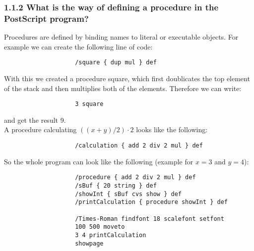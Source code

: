 \documentclass{article}
\begin{document}
\begin{adjustwidth}{2em}{2em}
		\subsubsection*{1.1.2 What is the way of defining a procedure in the PostScript program?}
		\begin{adjustwidth}{2em}{}
			Procedures are defined by binding names to literal or executable objects. For example we can create the following line of code:
			\begin{adjustwidth}{2em}{2em}
			\begin{tcolorbox}
				\begin{verbatim}
					/square { dup mul } def
				\end{verbatim}
			\end{tcolorbox}
			\end{adjustwidth}
			\noindent With this we created a procedure square, which first doublicates the top element of the stack and then multiplies both of the elements. Therefore we can write:
			\begin{adjustwidth}{2em}{2em}
			\begin{tcolorbox}
				\begin{verbatim}
					3 square
				\end{verbatim}
			\end{tcolorbox}
			\end{adjustwidth}
			\noindent and get the result 9. \\
			A procedure calculating $((x+y) / 2) \cdot 2$ looks like the following:
			\begin{adjustwidth}{2em}{2em}
			\begin{tcolorbox}
				\begin{verbatim}
					/calculation { add 2 div 2 mul } def
				\end{verbatim}
			\end{tcolorbox}
			\end{adjustwidth}
			\noindent So the whole program can look like the following (example for $x=3$ and $y=4$):
			\begin{adjustwidth}{2em}{2em}
			\begin{tcolorbox}
				\begin{verbatim}
					/procedure { add 2 div 2 mul } def
					/sBuf { 20 string } def
					/showInt { sBuf cvs show } def
					/printCalculation { procedure showInt } def
					
					/Times-Roman findfont 18 scalefont setfont
					100 500 moveto
					3 4 printCalculation
					showpage
				\end{verbatim}
			\end{tcolorbox}
			\end{adjustwidth}
		\end{adjustwidth}

\end{adjustwidth}
\end{document}
